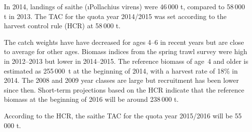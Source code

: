 In 2014, landings of saithe ({\i Pollachius virens}) were 46\,000 t, compared to
58\,000 t in 2013. The TAC for the quota year 2014/2015 was set according to the
harvest control rule (HCR) at 58\,000 t.

The catch weights have have decreased for ages 4--6 in recent years but are
close to average for other ages. Biomass indices from the spring trawl survey
were high in \mbox{2012--2013} but lower in 2014--2015. The reference biomass of
age~4 and older is estimated as 255\,000~t at the beginning of 2014, with a
harvest rate of 18\% in 2014. The 2008 and 2009 year classes are large but
recruitment has been lower since then. Short-term projections based on the HCR
indicate that the reference biomass at the beginning of 2016 will be around
238\,000 t.

According to the HCR, the saithe TAC for the quota year 2015/2016 will be
55\,000 t.
